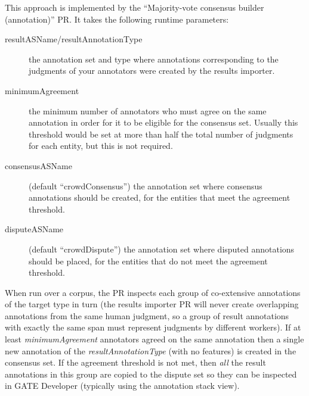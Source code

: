 This approach is implemented by the ``Majority-vote consensus builder
(annotation)'' PR.  It takes the following runtime parameters:
\begin{description}
\item[resultASName/resultAnnotationType] the annotation set and type where
  annotations corresponding to the judgments of your annotators were created by
  the results importer.
\item[minimumAgreement] the minimum number of annotators who must agree on the
  same annotation in order for it to be eligible for the consensus set.  Usually
  this threshold would be set at more than half the total number of judgments
  for each entity, but this is not required.
\item[consensusASName] (default ``crowdConsensus'') the annotation set where
  consensus annotations should be created, for the entities that meet the
  agreement threshold.
\item[disputeASName] (default ``crowdDispute'') the annotation set where
  disputed annotations should be placed, for the entities that do not meet the
  agreement threshold.
\end{description}

When run over a corpus, the PR inspects each group of co-extensive annotations
of the target type in turn (the results importer PR will never create
overlapping annotations from the same human judgment, so a group of result
annotations with exactly the same span must represent judgments by different
workers).  If at least \emph{minimumAgreement} annotators agreed on the same
annotation then a single new annotation of the \emph{resultAnnotationType}
(with no features) is created in the consensus set.  If the agreement threshold
is not met, then \emph{all} the result annotations in this group are copied to
the dispute set so they can be inspected in GATE Developer (typically using the
annotation stack view).

